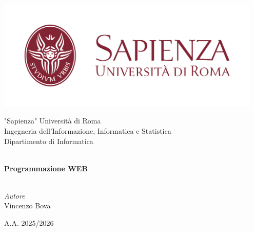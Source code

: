 \documentclass[12pt]{article}
\begin{document}
    \begin{titlepage}
        \centering

        \includegraphics[width=0.95\textwidth]{logo_sapienza.png}
        
        
        {\LARGE "Sapienza" Università di Roma}\\[3pt]
        {\Large Ingegneria dell'Informazione, Informatica e Statistica}\\[3pt]
        {\large Dipartimento di Informatica}\\[3pt]
        
        
        \hrulefill\\
        \vspace{15pt}
        \textbf{\huge Programmazione WEB}\\
        \vspace{7pt}
        \hrulefill\\
        
        
        \textit{\Large Autore}\\[3pt]
        {\Large Vincenzo Bova}\\
        

        {\large A.A. 2025/2026}\\
    \end{titlepage}

    \newpage
    \tableofcontents
\end{document}
